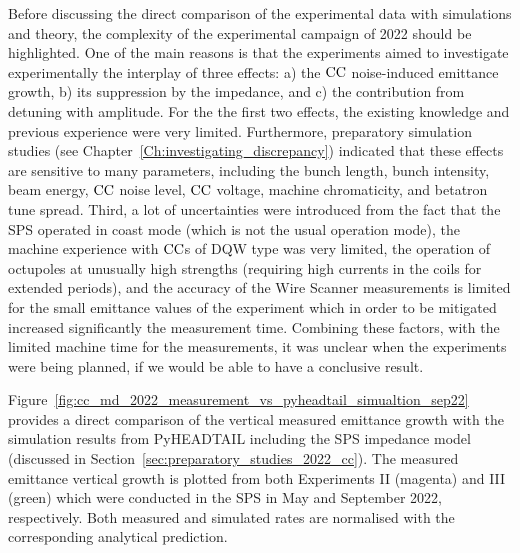 Before discussing the direct comparison of the experimental data with simulations and theory, the complexity of the experimental campaign of 2022 should be highlighted. One of the main reasons is that the experiments aimed to investigate experimentally the interplay of three effects: a) the ${\mathrm{CC}}$ noise-induced emittance growth, b) its suppression by the impedance, and c) the contribution from detuning with amplitude. For the the first two effects, the existing knowledge and previous experience were very limited. Furthermore, preparatory simulation studies (see Chapter~\ref{Ch:investigating_discrepancy}) indicated that these effects are sensitive to many parameters, including the bunch length, bunch intensity, beam energy, ${\mathrm{CC}}$ noise level, ${\mathrm{CC}}$ voltage, machine chromaticity, and betatron tune spread. Third, a lot of uncertainties were introduced from the fact that the SPS operated in coast mode (which is not the usual operation mode), the machine experience with ${\mathrm{CC}}$s of DQW type was very limited, the operation of octupoles at unusually high strengths (requiring high currents in the coils for extended periods), %
and the accuracy of the Wire Scanner measurements is limited for the small emittance values of the experiment which in order to be mitigated increased significantly the measurement time. Combining these factors, with the limited machine time for the measurements, it was unclear when the experiments were being planned, if we would be able to have a conclusive result.


Figure~\ref{fig:cc_md_2022_measurement_vs_pyheadtail_simualtion_sep22} provides a direct comparison of the vertical measured emittance growth with the simulation results from PyHEADTAIL including the SPS impedance model (discussed in Section~\ref{sec:preparatory_studies_2022_cc}). The measured emittance vertical growth is plotted from both Experiments II (magenta) and III (green) which were conducted in the SPS in May and September 2022, respectively. Both measured and simulated rates are normalised with the corresponding analytical prediction.


